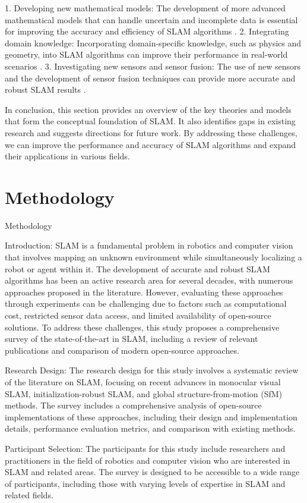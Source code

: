 \documentclass[conference]{IEEEtran}
\begin{document}
1. Developing new mathematical models: The development of more advanced mathematical models that can handle uncertain and incomplete data is essential for improving the accuracy and efficiency of SLAM algorithms \cite{srinivasa2018}.
2. Integrating domain knowledge: Incorporating domain-specific knowledge, such as physics and geometry, into SLAM algorithms can improve their performance in real-world scenarios \cite{gabrielsson2019}.
3. Investigating new sensors and sensor fusion: The use of new sensors and the development of sensor fusion techniques can provide more accurate and robust SLAM results \cite{sivaramakrishnan2018}.

In conclusion, this section provides an overview of the key theories and models that form the conceptual foundation of SLAM. It also identifies gaps in existing research and suggests directions for future work. By addressing these challenges, we can improve the performance and accuracy of SLAM algorithms and expand their applications in various fields.

\section{Methodology}
Methodology

Introduction:
SLAM is a fundamental problem in robotics and computer vision that involves mapping an unknown environment while simultaneously localizing a robot or agent within it. The development of accurate and robust SLAM algorithms has been an active research area for several decades, with numerous approaches proposed in the literature. However, evaluating these approaches through experiments can be challenging due to factors such as computational cost, restricted sensor data access, and limited availability of open-source solutions. To address these challenges, this study proposes a comprehensive survey of the state-of-the-art in SLAM, including a review of relevant publications and comparison of modern open-source approaches.

Research Design:
The research design for this study involves a systematic review of the literature on SLAM, focusing on recent advances in monocular visual SLAM, initialization-robust SLAM, and global structure-from-motion (SfM) methods. The survey includes a comprehensive analysis of open-source implementations of these approaches, including their design and implementation details, performance evaluation metrics, and comparison with existing methods.

Participant Selection:
The participants for this study include researchers and practitioners in the field of robotics and computer vision who are interested in SLAM and related areas. The survey is designed to be accessible to a wide range of participants, including those with varying levels of expertise in SLAM and related fields.
\end{document}
